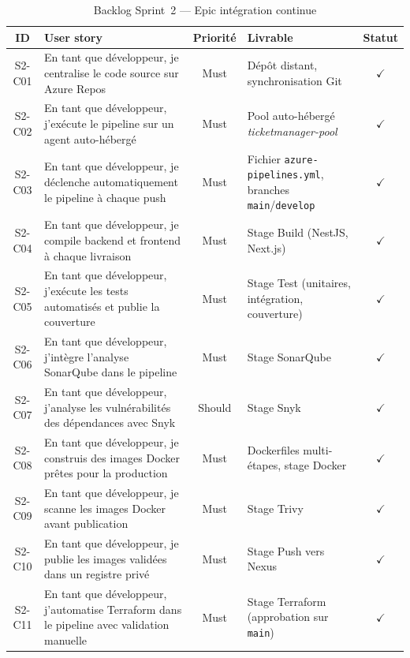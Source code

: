 \begin{table}[H]
\centering
\footnotesize
\renewcommand{\arraystretch}{0.9}
\setlength{\tabcolsep}{4pt}
\begin{tabular}{|c|p{5.2cm}|c|p{4.2cm}|c|}
\hline
\textbf{ID} & \textbf{User story} & \textbf{Priorité} & \textbf{Livrable} & \textbf{Statut} \\
\hline
S2-C01 & En tant que développeur, je centralise le code source sur Azure Repos & Must & Dépôt distant, synchronisation Git & $\checkmark$ \\
\hline
S2-C02 & En tant que développeur, j'exécute le pipeline sur un agent auto-hébergé & Must & Pool auto-hébergé \textit{ticketmanager-pool} & $\checkmark$ \\
\hline
S2-C03 & En tant que développeur, je déclenche automatiquement le pipeline à chaque push & Must & Fichier \texttt{azure-pipelines.yml}, branches \texttt{main}/\texttt{develop} & $\checkmark$ \\
\hline
S2-C04 & En tant que développeur, je compile backend et frontend à chaque livraison & Must & Stage Build (NestJS, Next.js) & $\checkmark$ \\
\hline
S2-C05 & En tant que développeur, j'exécute les tests automatisés et publie la couverture & Must & Stage Test (unitaires, intégration, couverture) & $\checkmark$ \\
\hline
S2-C06 & En tant que développeur, j'intègre l'analyse SonarQube dans le pipeline & Must & Stage SonarQube & $\checkmark$ \\
\hline
S2-C07 & En tant que développeur, j'analyse les vulnérabilités des dépendances avec Snyk & Should & Stage Snyk & $\checkmark$ \\
\hline
S2-C08 & En tant que développeur, je construis des images Docker prêtes pour la production & Must & Dockerfiles multi-étapes, stage Docker & $\checkmark$ \\
\hline
S2-C09 & En tant que développeur, je scanne les images Docker avant publication & Must & Stage Trivy & $\checkmark$ \\
\hline
S2-C10 & En tant que développeur, je publie les images validées dans un registre privé & Must & Stage Push vers Nexus & $\checkmark$ \\
\hline
S2-C11 & En tant que développeur, j'automatise Terraform dans le pipeline avec validation manuelle & Must & Stage Terraform (approbation sur \texttt{main}) & $\checkmark$ \\
\hline
\end{tabular}
\caption{Backlog Sprint~2 — Epic intégration continue}
\label{tab:s2-backlog-cicd}
\end{table}

